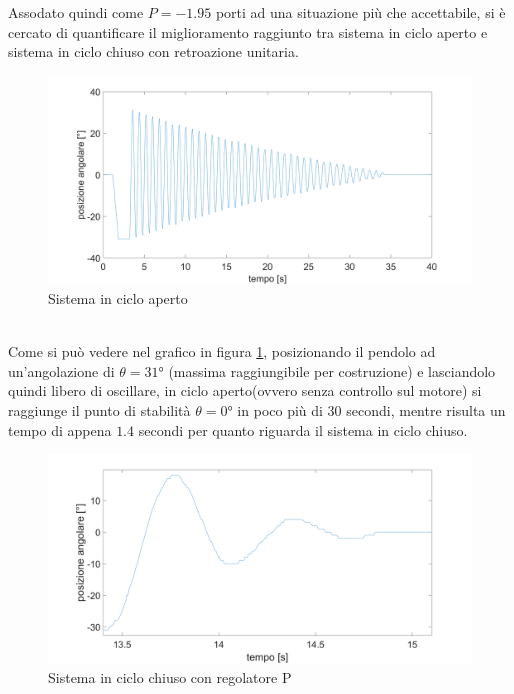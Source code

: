Assodato quindi come $P=-1.95$ porti ad una situazione più che accettabile, si è cercato di quantificare il miglioramento raggiunto tra sistema in ciclo aperto e sistema in ciclo chiuso con retroazione unitaria.
\begin{figure}[ht]
	\centering
	\includegraphics[width=\linewidth]{oscillOL.PNG}
	\caption{Sistema in ciclo aperto}
	\label{oscillOL}
\end{figure}
\\Come si può vedere nel grafico in figura \ref{oscillOL}, posizionando il pendolo ad un'angolazione di $\theta=\ang{31}$ (massima raggiungibile per costruzione) e lasciandolo quindi libero di oscillare, in ciclo aperto(ovvero senza controllo sul motore) si raggiunge il punto di stabilità $\theta=\ang{0}$ in poco più di $30$ secondi, mentre risulta un tempo di appena $1.4$ secondi per quanto riguarda il sistema in ciclo chiuso.
\begin{figure}[ht]
	\centering
	\includegraphics[width=\linewidth]{oscillCL.PNG}
	\caption{Sistema in ciclo chiuso con regolatore P}
	\label{oscillCL}
\end{figure} 


